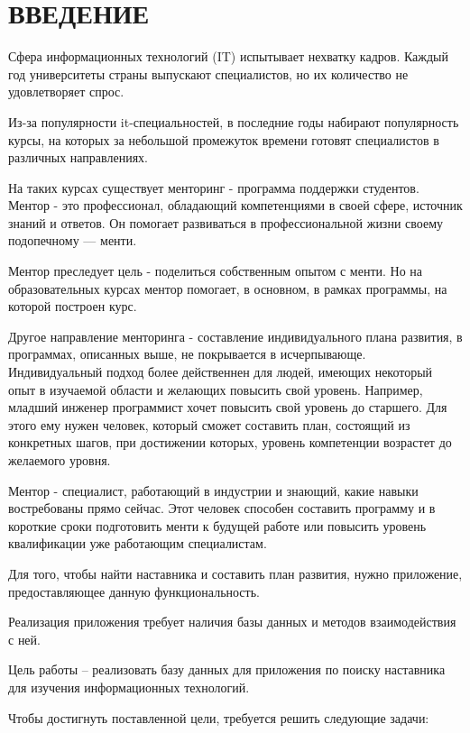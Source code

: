 \chapter*{ВВЕДЕНИЕ}

Сфера информационных технологий (IT) испытывает нехватку кадров. Каждый год университеты страны выпускают специалистов, но их
количество не удовлетворяет спрос.

Из-за популярности it-специальностей, в последние годы набирают популярность курсы, на которых за небольшой промежуток времени
готовят специалистов в различных направлениях.

На таких курсах существует менторинг - программа поддержки студентов. Ментор - это профессионал, обладающий компетенциями в своей сфере, источник знаний и ответов. Он помогает развиваться в профессиональной жизни своему подопечному — менти. 

Ментор преследует цель - поделиться собственным опытом с менти. Но на образовательных курсах ментор помогает, в основном, в рамках программы, на которой построен курс. 

Другое направление менторинга - составление индивидуального плана развития,  в программах, описанных выше, не покрывается в исчерпывающе. Индивидуальный подход более действеннен для людей, имеющих некоторый опыт в изучаемой области и желающих повысить свой уровень. Например, младший инженер программист хочет повысить свой уровень до старшего. Для этого ему нужен человек, который сможет составить план, состоящий из конкретных шагов, при достижении которых, уровень компетенции возрастет до желаемого уровня.  

Ментор - специалист, работающий в индустрии и знающий, какие навыки востребованы прямо сейчас. Этот человек
способен составить программу и в короткие сроки подготовить менти к будущей работе или повысить уровень квалификации уже работающим специалистам.

Для того, чтобы найти наставника и составить план развития, нужно приложение, предоставляющее данную функциональность. 

Реализация приложения требует наличия базы данных и методов взаимодействия с ней.

Цель работы -- реализовать базу данных для приложения по поиску наставника для изучения информационных технологий.

Чтобы достигнуть поставленной цели, требуется решить следующие задачи:

